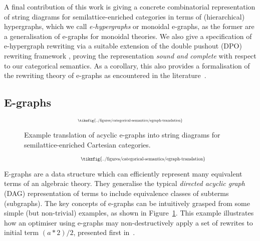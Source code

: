 A final contribution of this work is giving a concrete combinatorial representation of string diagrams for semilattice-enriched categories in terms of (hierarchical)  hypergraphs, which we call \textit{e-hypergraphs} or monoidal e-graphs, as the former are a generalisation of e-graphs for monoidal theories.
We also give a specification of e-hypergraph rewriting via a suitable extension of the double pushout (DPO) rewriting framework 
\cite{dpo, bonchi_string_2022-1,bonchi_string_2022-2,bonchi_string_2022-3},  proving the representation \textit{sound and complete} with respect to our categorical semantics.  
As a corollary, this also provides a formalisation of the rewriting theory of e-graphs as encountered in the literature~\cite{EggPaper}.

\subsection{E-graphs}

\ifdefined \ONECOLUMN
\begin{figure}
	\[
		\scalebox{0.55}{
		\tikzfig{../figures/categorical-semantics/egraph-translation}
		}
	\]
	\caption{Example translation of acyclic e-graphs into string diagrams for semilattice-enriched Cartesian categories. }
	\label{fig:e-graph-example}
	\end{figure}
\else
\begin{figure*}
\[
	\hspace{1.3cm}
    \scalebox{0.65}{
    \tikzfig{../figures/categorical-semantics/egraph-translation}
    }
\]
\captionsetup{skip=0pt, belowskip=-5mm}
\caption{Example translation of acyclic e-graphs into string diagrams for semilattice-enriched Cartesian categories. }
\label{fig:e-graph-example}
\end{figure*}
\fi

E-graphs are a data structure which can efficiently represent many equivalent terms of an algebraic theory.
They generalise the typical \emph{directed acyclic graph} (DAG) representation of terms to include equivalence classes of subterms (subgraphs).
The key concepts of e-graphs can be intuitively grasped from some simple (but non-trivial) examples, as shown in Figure~\ref{fig:e-graph-example}.
This example illustrates how an optimiser using e-graphs may non-destructively apply a set of rewrites to initial term $(a * 2) / 2$, presented first in~\cite{EggPaper}.

